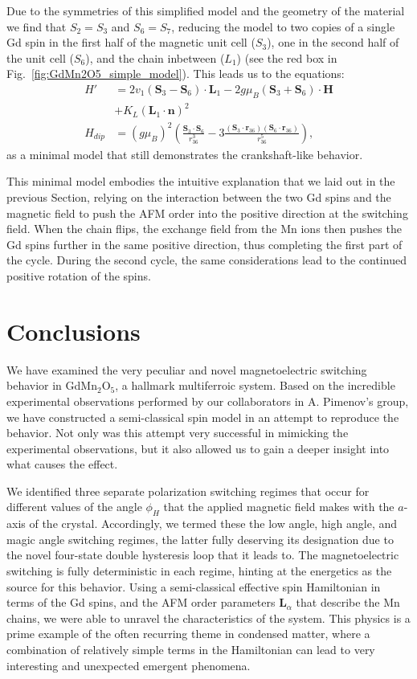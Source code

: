 Due to the symmetries of this simplified model and the geometry of the material we find that $S_2 = S_3$ and $S_6 = S_7$, reducing the model to two copies of a single Gd spin in the first half of the magnetic unit cell ($S_3$), one in the second half of the unit cell ($S_6$), and the chain inbetween ($L_1$) (see the red box in Fig.~\ref{fig:GdMn2O5_simple_model}).
This leads us to the equations:
\begin{align}
	H' &= 2v_1(\bm{S}_3 - \bm{S}_6)\cdot\bm{L}_1 - 2g \mu_B (\bm{S}_3 + \bm{S}_6) 
\cdot \bm{H} \\
	&+ K_L (\bm{L}_1 \cdot \bm{n})^2 \nonumber\\
	H_{dip} &= (g \mu_B)^2\left(\frac{\bm{S}_3\cdot \bm{S}_6}{r_{36}^3}-3\frac{(\bm{S}_3\cdot \bm{r}_{36})(\bm{S}_6\cdot \bm{r}_{36})}{r_{36}^5}\right)\nonumber,
\end{align}
as a minimal model that still demonstrates the crankshaft-like behavior.

This minimal model embodies the intuitive explanation that we laid out in the previous Section, relying on the interaction between the two Gd spins and the magnetic field to push the \gls{AFM} order into the positive direction at the switching field.
When the chain flips, the exchange field from the Mn ions then pushes the Gd spins further in the same positive direction, thus completing the first part of the cycle.
During the second cycle, the same considerations lead to the continued positive rotation of the spins.



\section{Conclusions}
We have examined the very peculiar and novel magnetoelectric switching behavior in GdMn$_2$O$_5$, a hallmark multiferroic system.
Based on the incredible experimental observations performed by our collaborators in A. Pimenov's group, we have constructed a semi-classical spin model in an attempt to reproduce the behavior.
Not only was this attempt very successful in mimicking the experimental observations, but it also allowed us to gain a deeper insight into what causes the effect.

We identified three separate polarization switching regimes that occur for different values of the angle $\phi_H$ that the applied magnetic field makes with the $a$-axis of the crystal.
Accordingly, we termed these the low angle, high angle, and magic angle switching regimes, the latter fully deserving its designation due to the novel four-state double hysteresis loop that it leads to.
The magnetoelectric switching is fully deterministic in each regime, hinting at the energetics as the source for this behavior.
Using a semi-classical effective spin Hamiltonian in terms of the Gd spins, and the \gls{AFM} order parameters $\bm L_\alpha$ that describe the Mn chains, we were able to unravel the characteristics of the system.
This physics is a prime example of the often recurring theme in condensed matter, where a combination of relatively simple terms in the Hamiltonian can lead to very interesting and unexpected emergent phenomena.

